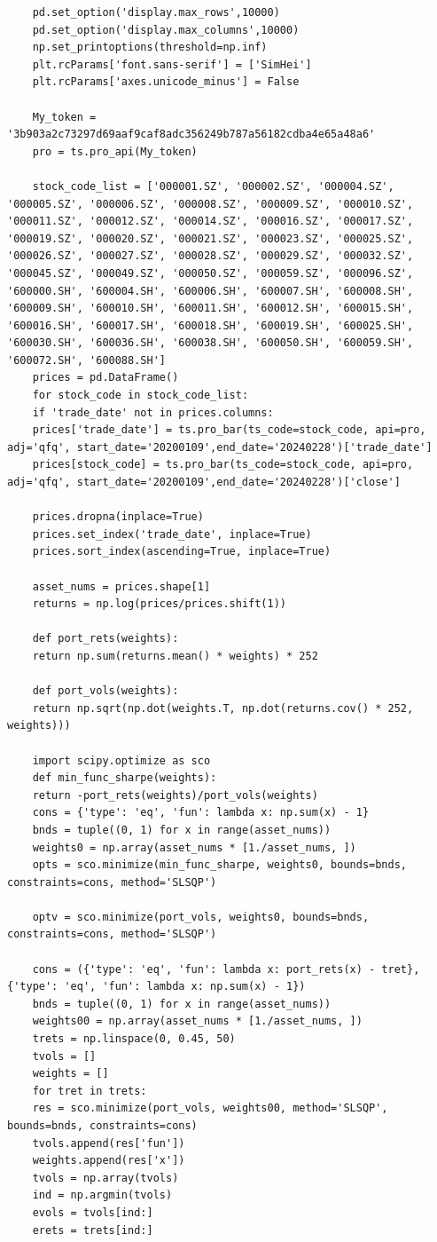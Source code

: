 \documentclass[default,iicol]{sn-jnl}%
\begin{document}
\begin{appendices}
\begin{lstlisting}
	pd.set_option('display.max_rows',10000)
	pd.set_option('display.max_columns',10000)
	np.set_printoptions(threshold=np.inf)
	plt.rcParams['font.sans-serif'] = ['SimHei'] 
	plt.rcParams['axes.unicode_minus'] = False 
	
	My_token = '3b903a2c73297d69aaf9caf8adc356249b787a56182cdba4e65a48a6'
	pro = ts.pro_api(My_token)
	
	stock_code_list = ['000001.SZ', '000002.SZ', '000004.SZ', '000005.SZ', '000006.SZ', '000008.SZ', '000009.SZ', '000010.SZ', '000011.SZ', '000012.SZ', '000014.SZ', '000016.SZ', '000017.SZ', '000019.SZ', '000020.SZ', '000021.SZ', '000023.SZ', '000025.SZ', '000026.SZ', '000027.SZ', '000028.SZ', '000029.SZ', '000032.SZ', '000045.SZ', '000049.SZ', '000050.SZ', '000059.SZ', '000096.SZ', '600000.SH', '600004.SH', '600006.SH', '600007.SH', '600008.SH', '600009.SH', '600010.SH', '600011.SH', '600012.SH', '600015.SH', '600016.SH', '600017.SH', '600018.SH', '600019.SH', '600025.SH', '600030.SH', '600036.SH', '600038.SH', '600050.SH', '600059.SH', '600072.SH', '600088.SH']
	prices = pd.DataFrame() 
	for stock_code in stock_code_list:
	if 'trade_date' not in prices.columns:
	prices['trade_date'] = ts.pro_bar(ts_code=stock_code, api=pro, adj='qfq', start_date='20200109',end_date='20240228')['trade_date']
	prices[stock_code] = ts.pro_bar(ts_code=stock_code, api=pro, adj='qfq', start_date='20200109',end_date='20240228')['close']
	
	prices.dropna(inplace=True) 
	prices.set_index('trade_date', inplace=True)
	prices.sort_index(ascending=True, inplace=True)
	
	asset_nums = prices.shape[1]
	returns = np.log(prices/prices.shift(1))
	
	def port_rets(weights):
	return np.sum(returns.mean() * weights) * 252  
	
	def port_vols(weights):
	return np.sqrt(np.dot(weights.T, np.dot(returns.cov() * 252, weights))) 
	
	import scipy.optimize as sco
	def min_func_sharpe(weights):
	return -port_rets(weights)/port_vols(weights)
	cons = {'type': 'eq', 'fun': lambda x: np.sum(x) - 1} 
	bnds = tuple((0, 1) for x in range(asset_nums))
	weights0 = np.array(asset_nums * [1./asset_nums, ]) 
	opts = sco.minimize(min_func_sharpe, weights0, bounds=bnds, constraints=cons, method='SLSQP')

	optv = sco.minimize(port_vols, weights0, bounds=bnds, constraints=cons, method='SLSQP')
	
	cons = ({'type': 'eq', 'fun': lambda x: port_rets(x) - tret}, {'type': 'eq', 'fun': lambda x: np.sum(x) - 1})  
	bnds = tuple((0, 1) for x in range(asset_nums)) 
	weights00 = np.array(asset_nums * [1./asset_nums, ]) 
	trets = np.linspace(0, 0.45, 50)
	tvols = []
	weights = []
	for tret in trets:
	res = sco.minimize(port_vols, weights00, method='SLSQP', bounds=bnds, constraints=cons)
	tvols.append(res['fun'])
	weights.append(res['x'])
	tvols = np.array(tvols)
	ind = np.argmin(tvols)
	evols = tvols[ind:]
	erets = trets[ind:]
	

\end{lstlisting}
\end{appendices}
\end{document}
